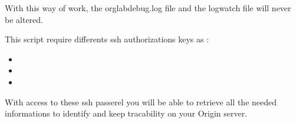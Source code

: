 \documentclass[letterpaper,10pt,english]{sphinxmanual}
\begin{document}
\sphinxAtStartPar
With this way of work, the orglabdebug.log file and the logwatch file will never be altered.

\sphinxAtStartPar
This script require differents ssh authorizations keys as :
\begin{itemize}
\item {} 
\sphinxAtStartPar
{} 

\item {} 
\sphinxAtStartPar
{} 

\item {} 
\sphinxAtStartPar
{} 

\end{itemize}

\sphinxAtStartPar
With access to these ssh passerel you will be able to retrieve all the needed informations to identify and keep tracability on your Origin server.
\end{document}
